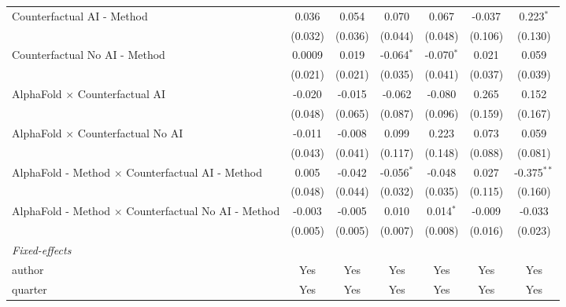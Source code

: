 \begin{tabular}{lcccccc}
   Counterfactual AI - Method                                 & 0.036        & 0.054        & 0.070        & 0.067        & -0.037  & 0.223$^{*}$\\   
                                                              & (0.032)      & (0.036)      & (0.044)      & (0.048)      & (0.106) & (0.130)\\   
   Counterfactual No AI - Method                              & 0.0009       & 0.019        & -0.064$^{*}$ & -0.070$^{*}$ & 0.021   & 0.059\\   
                                                              & (0.021)      & (0.021)      & (0.035)      & (0.041)      & (0.037) & (0.039)\\   
   AlphaFold $\times$ Counterfactual AI                       & -0.020       & -0.015       & -0.062       & -0.080       & 0.265   & 0.152\\   
                                                              & (0.048)      & (0.065)      & (0.087)      & (0.096)      & (0.159) & (0.167)\\   
   AlphaFold $\times$ Counterfactual No AI                    & -0.011       & -0.008       & 0.099        & 0.223        & 0.073   & 0.059\\   
                                                              & (0.043)      & (0.041)      & (0.117)      & (0.148)      & (0.088) & (0.081)\\   
   AlphaFold - Method $\times$ Counterfactual AI - Method     & 0.005        & -0.042       & -0.056$^{*}$ & -0.048       & 0.027   & -0.375$^{**}$\\   
                                                              & (0.048)      & (0.044)      & (0.032)      & (0.035)      & (0.115) & (0.160)\\   
   AlphaFold - Method $\times$ Counterfactual No AI - Method  & -0.003       & -0.005       & 0.010        & 0.014$^{*}$  & -0.009  & -0.033\\   
                                                              & (0.005)      & (0.005)      & (0.007)      & (0.008)      & (0.016) & (0.023)\\   
   \midrule
   \emph{Fixed-effects}\\
   author                                                     & Yes          & Yes          & Yes          & Yes          & Yes     & Yes\\  
   quarter                                                    & Yes          & Yes          & Yes          & Yes          & Yes     & Yes\\  

\end{tabular}
